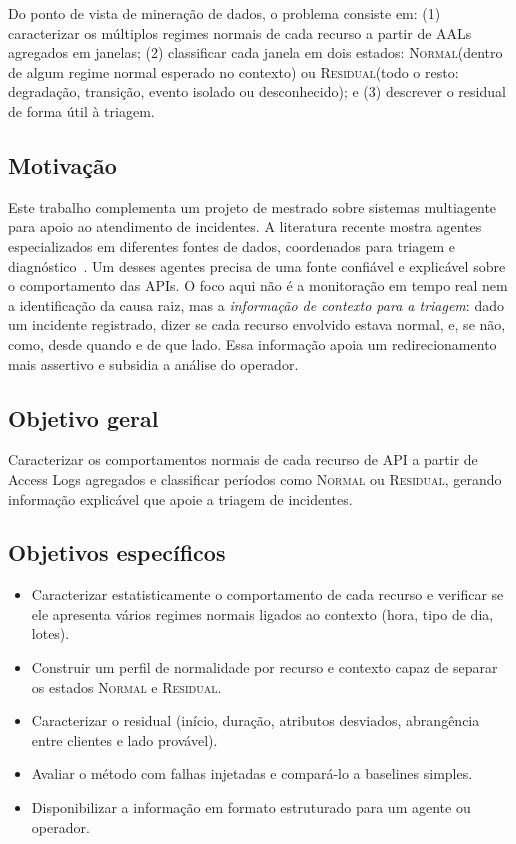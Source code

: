 \documentclass[sigconf,nonacm]{acmart}
\newcommand{\Normal}{\textsc{Normal}\xspace}
\newcommand{\Residual}{\textsc{Residual}\xspace}
\begin{document}
Do ponto de vista de mineração de dados, o problema consiste em: (1) caracterizar os múltiplos regimes normais de cada recurso a partir de AALs agregados em janelas; (2) classificar cada janela em dois estados: \Normal (dentro de algum regime normal esperado no contexto) ou \Residual (todo o resto: degradação, transição, evento isolado ou desconhecido); e (3) descrever o residual de forma útil à triagem.

\subsection{Motivação}
Este trabalho complementa um projeto de mestrado sobre sistemas multiagente para apoio ao atendimento de incidentes. A literatura recente mostra agentes especializados em diferentes fontes de dados, coordenados para triagem e diagnóstico~\citep{yu2025triangle,luo2025opsagent,zhang2025isre}. Um desses agentes precisa de uma fonte confiável e explicável sobre o comportamento das APIs. O foco aqui não é a monitoração em tempo real nem a identificação da causa raiz, mas a \emph{informação de contexto para a triagem}: dado um incidente registrado, dizer se cada recurso envolvido estava normal, e, se não, como, desde quando e de que lado. Essa informação apoia um redirecionamento mais assertivo e subsidia a análise do operador.

\subsection{Objetivo geral}
Caracterizar os comportamentos normais de cada recurso de API a partir de Access Logs agregados e classificar períodos como \Normal ou \Residual, gerando informação explicável que apoie a triagem de incidentes.

\subsection{Objetivos específicos}
\begin{itemize}
  \item Caracterizar estatisticamente o comportamento de cada recurso e verificar se ele apresenta vários regimes normais ligados ao contexto (hora, tipo de dia, lotes).
  \item Construir um perfil de normalidade por recurso e contexto capaz de separar os estados \Normal e \Residual.
  \item Caracterizar o residual (início, duração, atributos desviados, abrangência entre clientes e lado provável).
  \item Avaliar o método com falhas injetadas e compará-lo a baselines simples.
  \item Disponibilizar a informação em formato estruturado para um agente ou operador.
\end{itemize}
\end{document}
